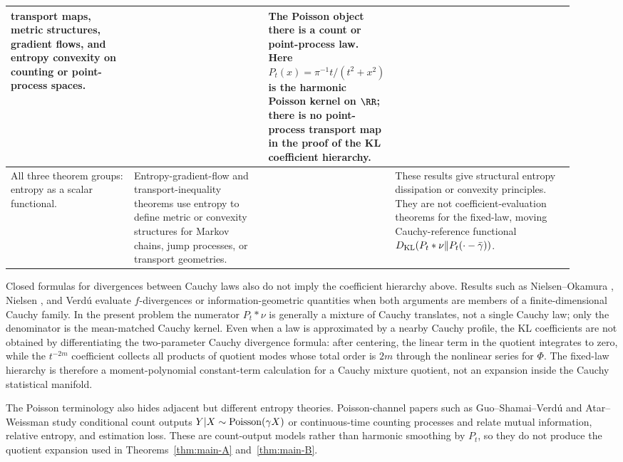 {\begin{longtable}{>{\raggedright\arraybackslash}p{0.22\linewidth}|%
>{\raggedright\arraybackslash}p{0.24\linewidth}|%
>{\raggedright\arraybackslash}p{0.14\linewidth}|%
>{\raggedright\arraybackslash}p{0.32\linewidth}}
transport maps, metric structures, gradient flows, and entropy convexity on
counting or point-process spaces.
& \cite{LopezRiveraShenfeld2025PoissonTransport,
ErbarHuesmannJalowyMuller2025StationaryPointTransport}
& The Poisson object there is a count or point-process law.  Here
\(P_t(x)=\pi^{-1}t/(t^2+x^2)\) is the harmonic Poisson kernel on \(\RR\);
there is no point-process transport map in the proof of the KL coefficient
hierarchy.\\
\hline
All three theorem groups: entropy as a scalar functional.
& Entropy-gradient-flow and transport-inequality theorems use entropy to
define metric or convexity structures for Markov chains, jump processes, or
transport geometries.
& \cite{OttoVillani2000,Maas2011EntropyMarkov,Erbar2014JumpEntropy}
& These results give structural entropy dissipation or convexity principles.
They are not coefficient-evaluation theorems for the fixed-law, moving
Cauchy-reference functional
\(D_{\rm KL}(P_t*\nu\|P_t(\cdot-\bar\gamma))\).\\
\end{longtable}
}

Closed formulas for divergences between Cauchy laws also do not imply the
coefficient hierarchy above.  Results such as Nielsen--Okamura
\cite{NielsenOkamura2023Cauchy}, Nielsen
\cite{Nielsen2020CauchyVoronoi}, and Verd{\'u}
\cite{Verdu2023Cauchy} evaluate \(f\)-divergences or information-geometric
quantities when both arguments are members of a finite-dimensional Cauchy
family.  In the present problem the numerator \(P_t*\nu\) is generally a
mixture of Cauchy translates, not a single Cauchy law; only the denominator is
the mean-matched Cauchy kernel.  Even when a law is approximated by a nearby
Cauchy profile, the KL coefficients are not obtained by differentiating the
two-parameter Cauchy divergence formula: after centering, the linear term in
the quotient integrates to zero, while the \(t^{-2m}\) coefficient collects
all products of quotient modes whose total order is \(2m\) through the
nonlinear series for \(\Phi\).  The fixed-law hierarchy is therefore a
moment-polynomial constant-term calculation for a Cauchy mixture quotient,
not an expansion inside the Cauchy statistical manifold.

The Poisson terminology also hides adjacent but different entropy theories.
Poisson-channel papers such as Guo--Shamai--Verd{\'u}
\cite{GuoShamaiVerdu2008PoissonChannel} and Atar--Weissman
\cite{AtarWeissman2012PoissonChannel} study conditional count outputs
\(Y|X\sim{\rm Poisson}(\gamma X)\) or continuous-time counting processes and
relate mutual information, relative entropy, and estimation loss.  These are
count-output models rather than harmonic smoothing by \(P_t\), so they do not
produce the quotient expansion used in Theorems~\ref{thm:main-A}
and~\ref{thm:main-B}.

